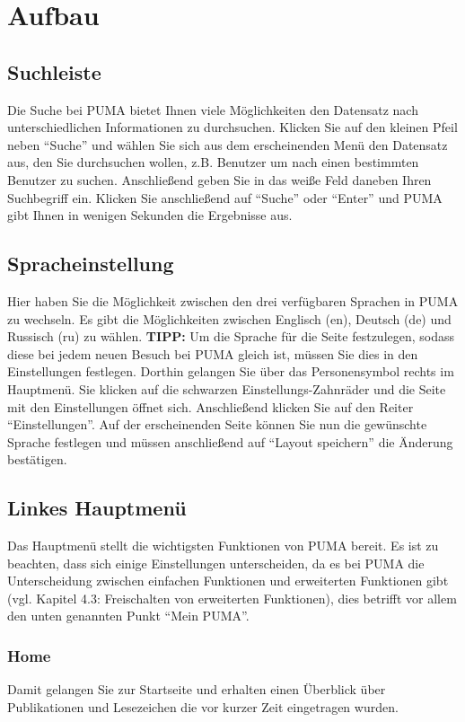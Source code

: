 \documentclass[a4paper,11pt,twoside]{scrbook}
\begin{document}
\newpage
\section{Aufbau}
\subsection{Suchleiste}
Die Suche bei PUMA bietet Ihnen viele Möglichkeiten den Datensatz nach unterschiedlichen Informationen zu durchsuchen. Klicken Sie auf den kleinen Pfeil neben \enquote{Suche} und wählen Sie sich aus dem erscheinenden Menü den Datensatz aus, den Sie durchsuchen wollen, z.B. Benutzer um nach einen bestimmten Benutzer zu suchen. Anschließend geben Sie in das weiße Feld daneben Ihren Suchbegriff ein. Klicken Sie anschließend auf \enquote{Suche} oder \enquote{Enter} und PUMA gibt Ihnen in wenigen Sekunden die Ergebnisse aus.
\subsection{Spracheinstellung}
Hier haben Sie die Möglichkeit zwischen den drei verfügbaren Sprachen in PUMA zu wechseln. Es gibt die Möglichkeiten zwischen Englisch (en), Deutsch (de) und Russisch (ru) zu wählen.
\newline
\textbf{TIPP:} Um die Sprache für die Seite festzulegen, sodass diese bei jedem neuen Besuch bei PUMA gleich ist, müssen Sie dies in den Einstellungen festlegen. Dorthin gelangen Sie über das Personensymbol rechts im Hauptmenü. Sie klicken auf die schwarzen Einstellungs-Zahnräder und die Seite mit den Einstellungen öffnet sich. Anschließend klicken Sie auf den Reiter \enquote{Einstellungen}. Auf der erscheinenden Seite können Sie nun die gewünschte Sprache festlegen und müssen anschließend auf \enquote{Layout speichern} die Änderung bestätigen.
\subsection{Linkes Hauptmenü}
Das Hauptmenü stellt die wichtigsten Funktionen von PUMA bereit. Es ist zu beachten, dass sich einige Einstellungen unterscheiden, da es bei PUMA die Unterscheidung zwischen einfachen Funktionen und erweiterten Funktionen gibt (vgl. Kapitel 4.3: Freischalten von erweiterten Funktionen), dies betrifft vor allem den unten genannten Punkt \enquote{Mein PUMA}. 
\subsubsection{Home}
Damit gelangen Sie zur Startseite und erhalten einen Überblick über Publikationen und Lesezeichen die vor kurzer Zeit eingetragen wurden.
\end{document}
